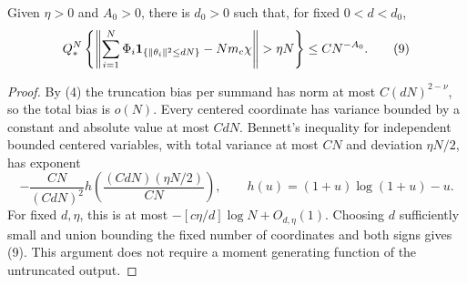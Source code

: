 \documentclass[11pt]{article}
\begin{document}
\begin{lemma}\label{lem:bennett}
Given $\eta>0$ and $A_0>0$, there is $d_0>0$ such that, for fixed
$0<d<d_0$,
\[
 Q_*^N\left\{\left\|\sum_{i=1}^N\Phi_i
       \one_{\{\|\theta_i\|^2\le dN\}}-Nm_c\chi\right\|>\eta N\right\}
                         \le C N^{-A_0}.                \tag{9}
\]
\end{lemma}
\begin{proof}
By (4) the truncation bias per summand has norm at most
$C(dN)^{2-\nu}$, so the total bias is $o(N)$. Every centered coordinate
has variance bounded by a constant and absolute value at most $CdN$.
Bennett's inequality for independent bounded centered variables, with
total variance at most $CN$ and deviation $\eta N/2$, has exponent
\[
 -\frac{CN}{(CdN)^2}
 h\left(\frac{(CdN)(\eta N/2)}{CN}\right),
 \qquad h(u)=(1+u)\log(1+u)-u.
\]
For fixed $d,\eta$, this is at most
$-[c\eta/d]\log N+O_{d,\eta}(1)$. Choosing $d$ sufficiently small
and union bounding the fixed number of coordinates and both signs gives
(9). This argument does not require a moment generating function of the
untruncated output.
\end{proof}
\end{document}

